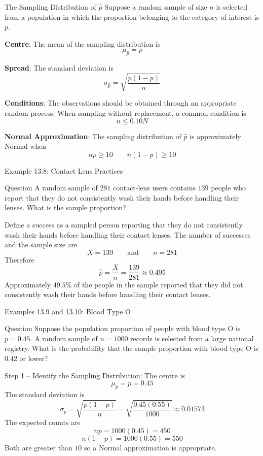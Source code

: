 \documentclass[aspectratio=169]{beamer}
\begin{document}
\begin{frame}{The Sampling Distribution of $\hat{p}$}
Suppose a random sample of size $n$ is selected from a population in which the proportion belonging to the category of interest is $p$.

\textbf{Centre}: The mean of the sampling distribution is
$$\mu_{\hat{p}}=p$$

\textbf{Spread}: The standard deviation is
$$\sigma_{\hat{p}}=\sqrt{\frac{p(1-p)}{n}}$$

\textbf{Conditions}: The observations should be obtained through an appropriate random process. When sampling without replacement, a common condition is
$$n\leq 0.10N$$

\textbf{Normal Approximation}: The sampling distribution of $\hat{p}$ is approximately Normal when
$$np\geq10 \qquad n(1-p)\geq10$$
\end{frame}

\begin{frame}{Example 13.8: Contact Lens Practices}
\begin{block}{Question}
A random sample of $281$ contact-lens users contains $139$ people who report that they do not consistently wash their hands before handling their lenses. What is the sample proportion?
\end{block}

Define a success as a sampled person reporting that they do not consistently wash their hands before handling their contact lenses. The number of successes and the sample size are
$$X=139\qquad\text{and}\qquad n=281$$
Therefore
$$\hat{p}=\frac{X}{n}=\frac{139}{281}\approx0.495$$
Approximately $49.5\%$ of the people in the sample reported that they did not consistently wash their hands before handling their contact lenses.
\end{frame}

\begin{frame}{Examples 13.9 and 13.10: Blood Type O}
\begin{block}{Question}
Suppose the population proportion of people with blood type O is $p=0.45$. A random sample of $n=1000$ records is selected from a large national registry. What is the probability that the sample proportion with blood type O is $0.42$ or lower?
\end{block}

Step 1 -- Identify the Sampling Distribution: The centre is
$$\mu_{\hat{p}}=p=0.45$$
The standard deviation is
$$\sigma_{\hat{p}}=\sqrt{\frac{p(1-p)}{n}}=\sqrt{\frac{0.45(0.55)}{1000}}\approx0.01573$$
The expected counts are
$$np=1000(0.45)=450$$
$$n(1-p)=1000(0.55)=550$$
Both are greater than $10$ so a Normal approximation is appropriate.
\end{frame}
\end{document}
